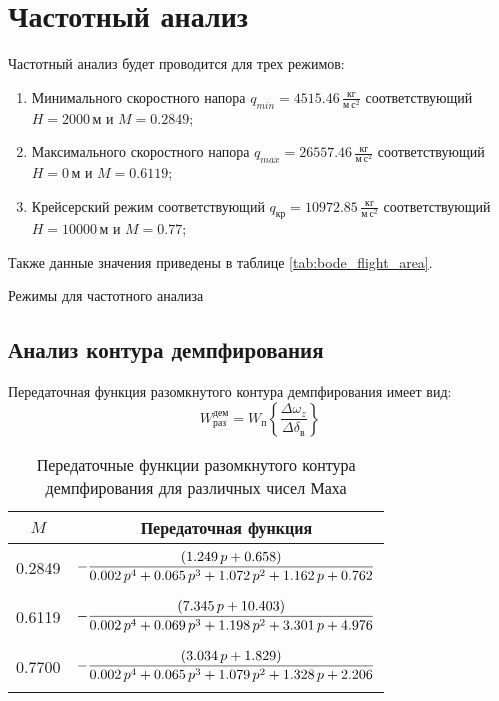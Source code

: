 \section{Частотный анализ}

Частотный анализ будет проводится для трех режимов:
\begin{enumerate}
    \item Минимального скоростного напора $q_{min}=4515.46\, \frac{кг}{м\ с^2}$
        соответствующий $H=2000\, м$ и $M = 0.2849$;
    \item Максимального скоростного напора $q_{max}= 26557.46\, \frac{кг}{м\
        с^2}$ соответствующий $H = 0\, м$ и $M = 0.6119$;
    \item Крейсерский режим соответствующий $q_{кр} = 10972.85\, \frac{кг}{м\
        с^2}$ соответствующий $H = 10000\, м$ и $M = 0.77$;
\end{enumerate}
Также данные значения приведены в таблице \ref{tab:bode_flight_area}.

\begin{table}[H]
    \centering
    \caption{Режимы для частотного анализа}
    \label{tab:bode_flight_area}
    
\end{table}

\subsection{Анализ контура демпфирования}
Передаточная функция разомкнутого контура демпфирования имеет вид:
\begin{equation}
    W_{раз}^{дем} = W_{п} \left\{\frac{\Delta \omega_z}{\Delta \delta_\text{в}} \right\}
\end{equation}

\begin{table}[H]
    \centering
    \caption{Передаточные функции разомкнутого контура демпфирования для различных чисел Маха}
    \label{tab:demp_ol}
    \begin{tabular}{|c|c|}
    \hline 
    $M$ & Передаточная функция\\ 
    \hline
    0.2849 & $\displaystyle -\frac{\left(1.249\,p+0.658\right)}{0.002\,p^4+0.065\,p^3+1.072\,p^2+1.162\,p+0.762}\addstrut{3em}$\\ 
    \hline
    0.6119 & $\displaystyle -\frac{\left(7.345\,p+10.403\right)}{0.002\,p^4+0.069\,p^3+1.198\,p^2+3.301\,p+4.976}\addstrut{3em}$\\
    \hline
    0.7700 & $\displaystyle -\frac{\left(3.034\,p+1.829\right)}{0.002\,p^4+0.065\,p^3+1.079\,p^2+1.328\,p+2.206}\addstrut{3em}$ \\
    \hline
    \end{tabular}
\end{table}

